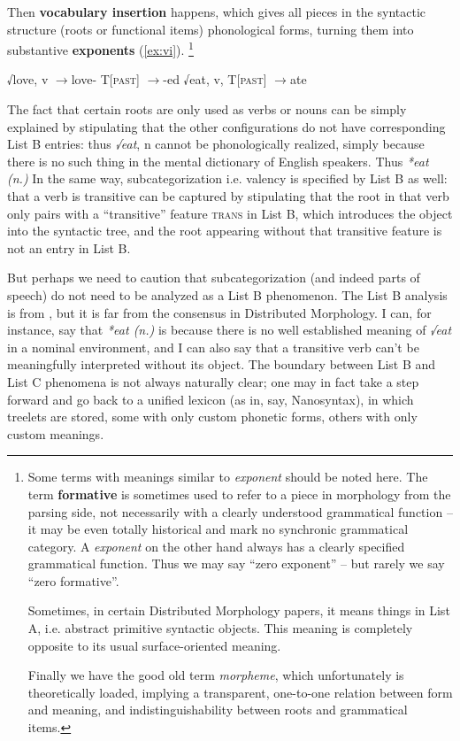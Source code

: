 \documentclass[a4paper, oneside, scheme=plain, 12pt]{article}
\newcommand*{\textto}{$\to$}
\newcommand*{\concept}[1]{\textbf{#1}}
\newcommand*{\term}[1]{\emph{#1}}
\newcommand{\form}[1]{\emph{#1}}
\newcommand*{\category}[1]{\textsc{#1}}
\begin{document}
Then \concept{vocabulary insertion} happens,
which gives all pieces in the syntactic structure (roots or functional items) phonological forms,
turning them into substantive \concept{exponents} (\ref{ex:vi}).%
\footnote{
    Some terms with meanings similar to \term{exponent} should be noted here.
    The term \concept{formative} is sometimes used to refer to a piece in morphology from the parsing side, not necessarily with a clearly understood grammatical function --
    it may be even totally historical and mark no synchronic grammatical category.
    A \term{exponent} on the other hand always has a clearly specified grammatical function.
    Thus we may say ``zero exponent'' -- but rarely we say ``zero formative''.

    Sometimes, in certain Distributed Morphology papers, it means things in List A,
    i.e. abstract primitive syntactic objects. 
    This meaning is completely opposite to its usual surface-oriented meaning.

    Finally we have the good old term \term{morpheme},
    which unfortunately is theoretically loaded, implying a transparent,
    one-to-one relation between form and meaning,
    and indistinguishability between roots and grammatical items.
}


\begin{exe}
    \ex\label{ex:vi} \begin{xlist}
        \ex √love, v \textto love-
        \ex T[\category{past}] \textto -ed
        \ex √eat, v, T[\category{past}] \textto ate
    \end{xlist}
\end{exe}

The fact that certain roots are only used as verbs or nouns
can be simply explained by stipulating that the other configurations do not have corresponding List B entries:
thus \form{√eat}, n cannot be phonologically realized,
simply because there is no such thing in the mental dictionary of English speakers.
Thus \form{*eat (n.)}
In the same way, subcategorization i.e. valency is specified by List B as well:
that a verb is transitive can be captured by stipulating that the root in that verb only pairs with a ``transitive'' feature \category{trans} in List B, which introduces the object into the syntactic tree, and the root appearing without that transitive feature is not an entry in List B.

But perhaps we need to caution that subcategorization (and indeed parts of speech) do not need to be analyzed as a List B phenomenon.
The List B analysis is from \citet{siddiqi2009syntax},
but it is far from the consensus in Distributed Morphology.
I can, for instance, say that \form{*eat (n.)} is because there is no well established meaning of \form{√eat} in a nominal environment,
and I can also say that a transitive verb can't be meaningfully interpreted without its object. 
The boundary between List B and List C phenomena is not always naturally clear;
one may in fact take a step forward and go back to a unified lexicon (as in, say, Nanosyntax),
in which treelets are stored, some with only custom phonetic forms, others with only custom meanings.
\end{document}
